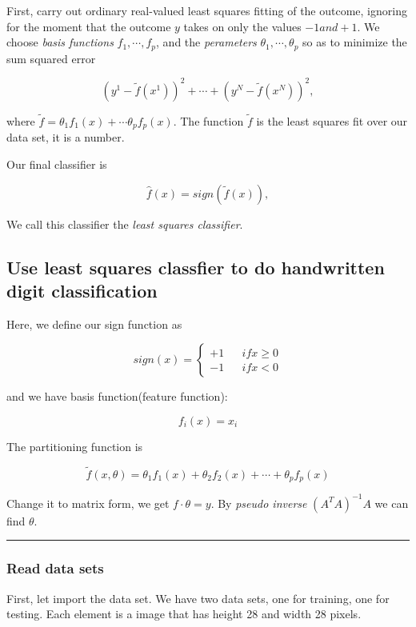 \documentclass[11pt]{article}
\begin{document}
First, carry out ordinary real-valued least squares fitting of the
outcome, ignoring for the moment that the outcome \(y\) takes on only
the values \(-1 and +1\). We choose \emph{basis functions}
\(f_{1},\cdots,f_{p}\), and the \emph{perameters}
\(\theta_{1},\cdots,\theta_{p}\) so as to minimize the sum squared error

\[(y^{1}-\tilde{f}(x^{1}))^{2}+\cdots+(y^{N}-\tilde{f}(x^{N}))^{2},\]

where \(\tilde{f} = \theta_{1}f_{1}(x)+\cdots\theta_{p}f_{p}(x)\). The
function \(\tilde{f}\) is the least squares fit over our data set, it is
a number.

Our final classifier is

\[\hat{f}(x) = sign(\tilde{f}(x)),\]

We call this classifier the \emph{least squares classifier}.

\subsection{Use least squares classfier to do handwritten digit
classification}\label{use-least-squares-classfier-to-do-handwritten-digit-classification}

Here, we define our sign function as

\[ sign(x)=\left\{
\begin{aligned}
+1 & & if  x \geq 0 \\
-1 & & if  x < 0 
\end{aligned}
\right.
\]

and we have basis function(feature function):

\[f_{i}(x) = x_{i}\]

The partitioning function is

\[\tilde{f}(x,\theta) = \theta_{1}f_{1}(x) + \theta_{2}f_{2}(x) + \cdots + \theta_{p}f_{p}(x)\]

Change it to matrix form, we get \(f \cdot \theta = y\). By \emph{pseudo
inverse} \((A^{T}A)^{-1}A\) we can find \(\theta\).

\begin{center}\rule{0.5\linewidth}{\linethickness}\end{center}

\subsubsection{Read data sets}\label{read-data-sets}

First, let import the data set. We have two data sets, one for training,
one for testing. Each element is a image that has height 28 and width 28
pixels.
\end{document}
